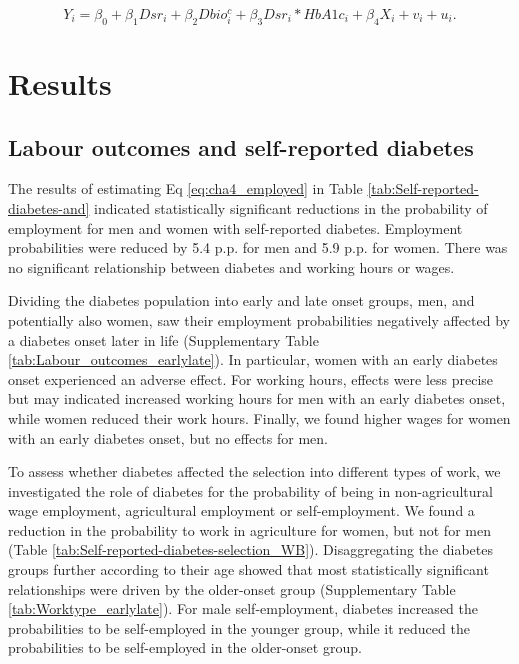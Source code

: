 \documentclass[12pt,english]{article}
\begin{document}
\begin{equation}
Y_{i}=\beta_{0}+\beta_{1}Dsr_{i}+\beta_{2}Dbio^{c}_{i}+\beta_{3}Dsr_{i}*HbA1c_{i}+\beta_{4}X_{i}+v_{i}+u_{i}.\label{eq:diab_hba1c}
\end{equation}

\section{\label{sec:cha_4_results}Results}


\subsection{Labour outcomes and self-reported diabetes}

The results of estimating Eq \ref{eq:cha4_employed} in Table \ref{tab:Self-reported-diabetes-and} indicated statistically significant reductions in the probability of employment for men and women with self-reported diabetes. Employment probabilities were reduced by 5.4 \ac{p.p.} for men and 5.9 \ac{p.p.} for women. There was no significant relationship between diabetes and working hours or wages. 

Dividing the diabetes population into early and late onset groups, men, and potentially also women, saw their employment probabilities negatively affected by a diabetes onset later in life (Supplementary Table \ref{tab:Labour_outcomes_earlylate}). In particular, women with an early diabetes onset experienced an adverse effect. For working hours, effects were less precise but may indicated increased working hours for men with an early diabetes onset, while women reduced their work hours. Finally, we found higher wages for women with an early diabetes onset, but no effects for men. 


To assess whether diabetes affected the selection into different types of work, we investigated the role of diabetes for the probability of being in non-agricultural wage employment, agricultural employment or self-employment. We found a reduction in the probability to work in agriculture for women, but not for men (Table \ref{tab:Self-reported-diabetes-selection_WB}). Disaggregating the diabetes groups further according to their age showed that most statistically significant relationships were driven by the older-onset group (Supplementary Table \ref{tab:Worktype_earlylate}). For male self-employment, diabetes increased the probabilities to be self-employed in the younger group, while it reduced the probabilities to be self-employed in the older-onset group.
\end{document}
